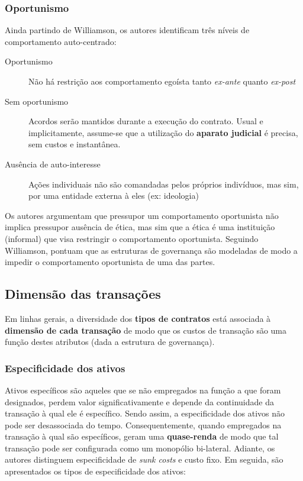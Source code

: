 \subsubsection*{Oportunismo}

Ainda partindo de Williamson, os autores identificam três níveis de comportamento auto-centrado:

\begin{description}
	\item[Oportunismo] Não há restrição aos comportamento egoísta tanto \textit{ex-ante} quanto \textit{ex-post}
	\item[Sem oportunismo] Acordos serão mantidos durante a execução do contrato. Usual e implicitamente, assume-se que a utilização do \textbf{aparato judicial} é precisa, sem custos e instantânea.
	\item[Ausência de auto-interesse] Ações individuais não são comandadas pelos próprios indivíduos, mas sim, por uma entidade externa à eles (ex: ideologia)
\end{description}

Os autores argumentam que pressupor um comportamento oportunista não implica pressupor ausência de ética, mas sim que a ética é uma instituição (informal) que visa restringir o comportamento oportunista. Seguindo Williamson, pontuam que as estruturas de governança são modeladas de modo a impedir o comportamento oportunista de uma das partes.

\subsection*{Dimensão das transações}

Em linhas gerais, a diversidade dos \textbf{tipos de contratos} está associada à \textbf{dimensão de cada transação} de modo que os custos de transação são uma função destes atributos (dada a estrutura de governança).

\subsubsection*{Especificidade dos ativos}

Ativos específicos são aqueles que se não empregados na função a que foram designados, perdem valor significativamente e depende da continuidade da transação à qual ele é específico. Sendo assim, a especificidade dos ativos não pode ser desassociada do tempo. Consequentemente, quando empregados na transação à qual são específicos, geram uma \textbf{quase-renda} de modo que tal transação pode ser configurada como um monopólio bi-lateral.
Adiante, os autores distinguem especificidade de \textit{sunk costs} e custo fixo. Em seguida, são apresentados os tipos de especificidade dos ativos:

